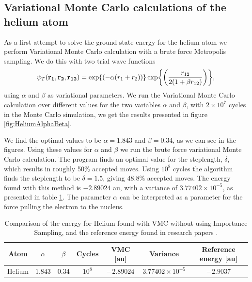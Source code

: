 
	\subsection{Variational Monte Carlo calculations of the helium atom}
		As a first attempt to solve the ground state energy for the helium
		atom we perform Variational Monte Carlo calculation with a brute force
		Metropolis sampling. We do this with two trial wave functions
		\[
		\psi_{T}({\bf r_{1}},{\bf r_{2}},{\bf r_{12}})=\exp{\left(-\alpha(r_{1}+r_{2})\right)}\exp{\left(\frac{r_{12}}{2(1+\beta r_{12})}\right)},
		\]
		using $\alpha$ and $\beta$ as variational parameters. 
		We run the Variational Monte Carlo calculation over
		different values for the two variables $\alpha$ and $\beta$, 
		with $2\times10^{7}$ cycles in the Monte Carlo simulation, we get the results
		presented in figure \ref{fig:HeliumAlphaBeta}.
		
		We find the optimal values to be  $\alpha=1.843$ and $\beta=0.34$, as we can see in the figures.
		Using these values for $\alpha$ and $\beta$ we run the brute force variational Monte Carlo calculation. The program finds an optimal value for the steplength, $\delta$, which results in roughly 50\% accepted moves. Using $10^{8}$ cycles the algorithm finds the steplength to be $\delta = 1.5$, giving 48.8\% accepted moves. The energy found with this method is $-2.89024$ au, with a variance of $3.77402\times10^{-5}$, as presented in table \ref{tab:Helium_no_IS}.
		The parameter $\alpha$ can be interpreted as a parameter for the
		force pulling the electron to the nucleus.

		\begin{table}
			\center
			\begin{tabular}{|c|c|c|c|c|c|c|}
			    \hline
			   	Atom  & $\alpha$ & $\beta$ & Cycles & VMC {[}au{]} & Variance & Reference energy {[}au{]} \tabularnewline
				\hline 
				Helium & $1.843$ & $0.34$ & $10^{8}$ & $-2.89024$ & $3.77402\times10^{-5}$ & $-2.9037$\tabularnewline
				\hline 
			\end{tabular}
			\caption{Comparison of the energy for Helium found with VMC without using Importance Sampling, and the reference energy found in research papers \parencite{Binkley_1975}.}
			\label{tab:Helium_no_IS}
		\end{table}
		


